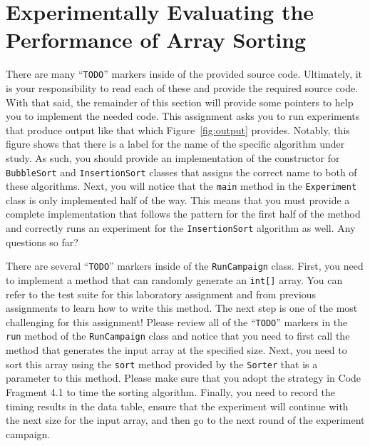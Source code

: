 \documentclass[11pt]{article}
\newcommand{\command}[1]{``\lstinline{#1}''}
\newcommand{\program}[1]{\lstinline{#1}}
\begin{document}
\section*{Experimentally Evaluating the Performance of Array Sorting}

There are many \command{TODO} markers inside of the provided source code.
Ultimately, it is your responsibility to read each of these and provide the
required source code. With that said, the remainder of this section will provide
some pointers to help you to implement the needed code. This assignment asks you
to run experiments that produce output like that which Figure~\ref{fig:output}
provides. Notably, this figure shows that there is a label for the name of the
specific algorithm under study. As such, you should provide an implementation of
the constructor for \program{BubbleSort} and \program{InsertionSort} classes
that assigns the correct name to both of these algorithms. Next, you will notice
that the \program{main} method in the \program{Experiment} class is only
implemented half of the way. This means that you must provide a complete
implementation that follows the pattern for the first half of the method and
correctly runs an experiment for the \program{InsertionSort} algorithm as well.
Any questions so far?

There are several \command{TODO} markers inside of the \program{RunCampaign}
class. First, you need to implement a method that can randomly generate an
\program{int[]} array. You can refer to the test suite for this laboratory
assignment and from previous assignments to learn how to write this method. The
next step is one of the most challenging for this assignment! Please review all
of the \command{TODO} markers in the \program{run} method of the
\program{RunCampaign} class and notice that you need to first call the method
that generates the input array at the specified size. Next, you need to sort
this array using the \program{sort} method provided by the \program{Sorter} that
is a parameter to this method. Please make sure that you adopt the strategy in
Code Fragment 4.1 to time the sorting algorithm. Finally, you need to record the
timing results in the data table, ensure that the experiment will continue with
the next size for the input array, and then go to the next round of the
experiment campaign.
\end{document}
